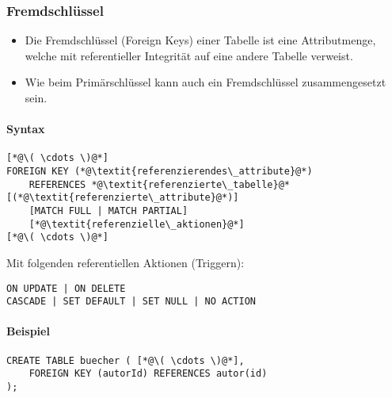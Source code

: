 \documentclass[a4paper, 11pt, accentcolor = tud3b]{tudreport}
\begin{document}
                \subsubsection{Fremdschlüssel} %
                    \begin{itemize}
                    	\item Die Fremdschlüssel (Foreign Keys) einer Tabelle ist eine Attributmenge, welche mit referentieller Integrität auf eine andere Tabelle verweist.
                    	\item Wie beim Primärschlüssel kann auch ein Fremdschlüssel zusammengesetzt sein.
                    \end{itemize}
                
                	\paragraph{Syntax}
                		\begin{lstlisting}
[*@\( \cdots \)@*]
FOREIGN KEY (*@\textit{referenzierendes\_attribute}@*)
	REFERENCES *@\textit{referenzierte\_tabelle}@* [(*@\textit{referenzierte\_attribute}@*)]
	[MATCH FULL | MATCH PARTIAL]
	[*@\textit{referenzielle\_aktionen}@*]
[*@\( \cdots \)@*]
                		\end{lstlisting}
                		
                		Mit folgenden referentiellen Aktionen (Triggern):
                		\begin{lstlisting}
ON UPDATE | ON DELETE
CASCADE | SET DEFAULT | SET NULL | NO ACTION
                		\end{lstlisting}
                
                	\paragraph{Beispiel}
                		\begin{lstlisting}
CREATE TABLE buecher ( [*@\( \cdots \)@*],
	FOREIGN KEY (autorId) REFERENCES autor(id)
);
                		\end{lstlisting}
                	
\end{document}
